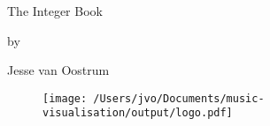 \documentclass{article}
\begin{document}
\begin{titlepage}
    \centering
	{\Huge The Integer Book\par}
	\vspace{2cm}
    {\large by\par}
    \vspace{1cm}
	{\Large Jesse van Oostrum}
    \vspace{5cm}
    \begin{figure}[h]
        \centering
        \texttt{[image: /Users/jvo/Documents/music-visualisation/output/logo.pdf]}
    \end{figure}

\end{titlepage}

\tableofcontents
\newpage




\end{document}
